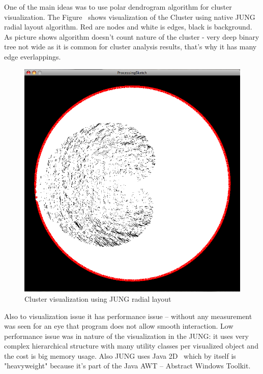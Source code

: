 \documentclass[a4paper,oneside]{article}
\begin{document}
One of the main ideas was to use polar dendrogram algorithm for cluster visualization. The Figure~\cite{JUNG_radial_layout} shows visualization of the Cluster using native JUNG radial layout algorithm. Red are nodes and white is edges, black is background. As picture shows algorithm doesn't count nature of the cluster - very deep binary tree not wide as it is common for cluster analysis results, that's why it has many edge everlappings.


\begin{figure}
\begin{center}
	\includegraphics[scale=0.3]{using_JUNG_radial.png}
	\caption{Cluster visualization using JUNG radial layout}
	\label{JUNG_radial_layout}
\end{center}
\end{figure}


Also to visualization issue it has performance issue -- without any measurement was seen for an eye that program does not allow smooth interaction. Low performance issue was in nature of the visualization in the JUNG: it uses very complex hierarchical structure with many utility classes per visualized object and the cost is big memory usage. Also JUNG uses Java 2D~\cite{JAVA_2D} which by itself is "heavyweight" because it's part of the Java AWT -- Abstract Windows Toolkit.
\end{document}
